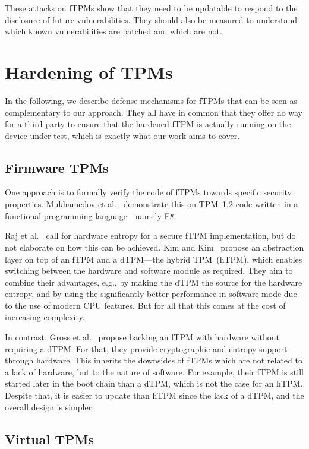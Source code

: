These attacks on \acp{fTPM} show that they need to be updatable to respond to the disclosure of future vulnerabilities.
They should also be measured to understand which known vulnerabilities are patched and which are not.

\section{Hardening of TPMs}

In the following, we describe defense mechanisms for fTPMs that can be seen as complementary to our approach.
They all have in common that they offer no way for a third party to ensure that the hardened fTPM is actually running on the device under test, which is exactly what our work aims to cover.

\subsection{Firmware TPMs}

One approach is to formally verify the code of fTPMs towards specific security properties.
Mukhamedov et al.~\cite{Mukhamedov2013} demonstrate this on TPM~1.2 code written in a functional programming language---namely F\texttt{\#}.

Raj et al.~\cite{Raj2015} call for hardware entropy for a secure \ac{fTPM} implementation, but do not elaborate on how this can be achieved.
Kim and Kim~\cite{Kim2019} propose an abstraction layer on top of an \ac{fTPM} and a \ac{dTPM}---the hybrid TPM~(hTPM), which enables switching between the hardware and software module as required.
They aim to combine their advantages, e.g., by making the dTPM the source for the hardware entropy, and by using the significantly better performance in software mode due to the use of modern CPU features.
But for all that this comes at the cost of increasing complexity.

In contrast, Gross et al.~\cite{Gross2021} propose backing an \ac{fTPM} with hardware without requiring a \ac{dTPM}.
For that, they provide cryptographic and entropy support through hardware.
This inherits the downsides of \acp{fTPM} which are not related to a lack of hardware, but to the nature of software.
For example, their \ac{fTPM} is still started later in the boot chain than a \ac{dTPM}, which is not the case for an hTPM\@.
Despite that, it is easier to update than hTPM since the lack of a dTPM, and the overall design is simpler.

\subsection{Virtual TPMs}

